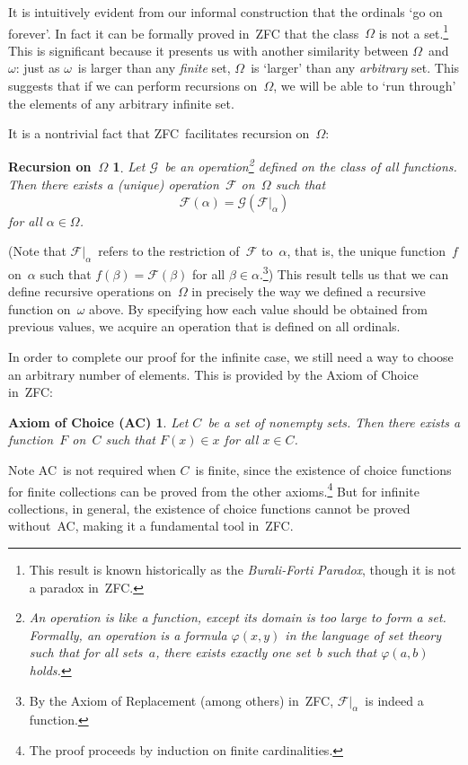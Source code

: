 \documentclass[letterpaper]{article}
\newcommand{\F}{\mathcal{F}}
\newcommand{\G}{\mathcal{G}}
\newtheorem*{recursion}{Recursion on~$\Omega$}
\newtheorem*{choice}{Axiom of Choice (AC)}
\begin{document}
It is intuitively evident from our informal construction that the ordinals `go on forever'. In fact it can be formally proved in~ZFC that the class~$\Omega$ is not a set.\footnote{This result is known historically as the \emph{Burali-Forti Paradox}, though it is not a paradox in~ZFC.} This is significant because it presents us with another similarity between $\Omega$~and~$\omega$: just as $\omega$~is larger than any \emph{finite} set, $\Omega$~is `larger' than any \emph{arbitrary} set. This suggests that if we can perform recursions on~$\Omega$, we will be able to `run through' the elements of any arbitrary infinite set.

It is a nontrivial fact that ZFC~facilitates recursion on~$\Omega$:
\begin{recursion}
Let $\G$~be an operation\footnote{An operation is like a function, except its domain is too large to form a set. Formally, an operation is a formula $\varphi(x,y)$ in the language of set theory such that for all sets~$a$, there exists exactly one set~$b$ such that $\varphi(a,b)$ holds.} defined on the class of all functions. Then there exists a (unique) operation~$\F$ on~$\Omega$ such that
$$\F(\alpha)=\G(\F|_{\alpha})$$
for all $\alpha\in\Omega$.
\end{recursion}
\noindent (Note that $\F|_{\alpha}$~refers to the restriction of~$\F$ to~$\alpha$, that is, the unique function~$f$ on~$\alpha$ such that $f(\beta)=\F(\beta)$ for all $\beta\in\alpha$.\footnote{By the Axiom of Replacement (among others) in~ZFC, $\F|_{\alpha}$~is indeed a function.}) This result tells us that we can define recursive operations on~$\Omega$ in precisely the way we defined a recursive function on~$\omega$ above. By specifying how each value should be obtained from previous values, we acquire an operation that is defined on all ordinals.

In order to complete our proof for the infinite case, we still need a way to choose an arbitrary number of elements. This is provided by the Axiom of Choice in~ZFC:
\begin{choice}
Let $C$~be a set of nonempty sets. Then there exists a function~$F$ on~$C$ such that $F(x)\in x$ for all $x\in C$.
\end{choice}
\noindent Note AC~is not required when $C$~is finite, since the existence of choice functions for finite collections can be proved from the other axioms.\footnote{The proof proceeds by induction on finite cardinalities.} But for infinite collections, in general, the existence of choice functions cannot be proved without~AC, making it a fundamental tool in~ZFC.
\end{document}
